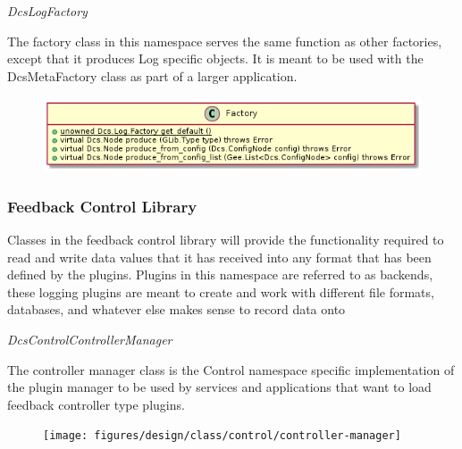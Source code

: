       \emph{DcsLogFactory}

      \vspace*{-0.75cm}
      \begin{minipage}[t]{0.5\textwidth}
        \vspace*{0.5cm}
        The factory class in this namespace serves the same function as other
        factories, except that it produces Log specific objects. It is meant to
        be used with the DcsMetaFactory class as part of a larger application.
      \end{minipage} \hfill
      \begin{minipage}[t]{0.45\textwidth}
        \begin{figure}[H]
          \includegraphics[width=\textwidth]{figures/design/class/log/factory}
          \label{fig:dsg-classes-log-factory}
        \end{figure}
      \end{minipage}

    \subsubsection{Feedback Control Library}\label{sec:dsg-classes-ctl}

      Classes in the feedback control library will provide the functionality
      required to
      read and write data values that it has received into any
      format that has been defined by the plugins. Plugins in this namespace are
      referred to as backends, these logging plugins are meant to create and
      work with different file formats, databases, and whatever else makes sense
      to record data onto

      \emph{DcsControlControllerManager}

      \vspace*{-0.75cm}
      \begin{minipage}[t]{0.5\textwidth}
        \vspace*{0.5cm}
        The controller manager class is the Control namespace specific
        implementation of the plugin manager to be used by services and
        applications that want to load feedback controller type plugins.
      \end{minipage} \hfill
      \begin{minipage}[t]{0.45\textwidth}
        \begin{figure}[H]
          \texttt{[image: figures/design/class/control/controller-manager]}
          \label{fig:dsg-classes-control-controller-manager}
        \end{figure}
      \end{minipage}


